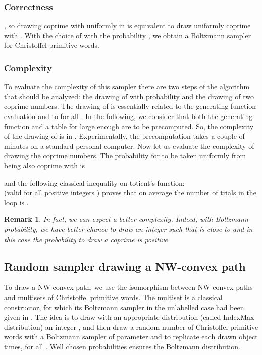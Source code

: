 \documentclass{article}
\newtheorem{remark}[theorem]{Remark}
\begin{document}
 \subsubsection{Correctness}
, so drawing  coprime with  uniformly in  is equivalent to draw uniformly  coprime with .
With the choice of  with the probability , we obtain a Boltzmann sampler for Christoffel primitive words.
\subsubsection{Complexity}
To evaluate the complexity of this sampler there are two steps
of the algorithm that should be analyzed: the drawing of 
with probability  and the drawing of two coprime numbers.
The drawing of  is essentially related to the generating
function evaluation and to  for all . In
the following, we consider that both the generating function and a
table for large enough  are to be precomputed. So,
the complexity of the drawing of  is in . Experimentally,
the precomputation takes a couple of minutes on a standard
personal computer. Now let us evaluate the complexity of drawing
the coprime numbers. The probability for  to be taken
uniformly from  being also coprime with  is

and the following classical inequality \cite[Thm 8.8.7]{BachShallit} on totient's function:\\
  (valid for all positive integers
) proves
that on average the number of trials in the loop is .\\
\begin{remark}
In fact, we can expect a better complexity. Indeed, with Boltzmann probability, we have better chance to draw an integer  such that  is close to  and in this case the probability to draw a coprime  is positive.
\end{remark}






\subsection{Random sampler drawing a NW-convex path}

To draw a NW-convex path, we use the isomorphism between NW-convex paths and multisets of Christoffel primitive words. 
The multiset is a classical constructor, for which its Boltzmann sampler in the unlabelled case had been given in \cite{FlaFuPi07}.
The idea is to draw with an appropriate distribution (called IndexMax distribution) an integer , 
and then draw a random number of Christoffel primitive words with a Boltzmann sampler of parameter  and to 
replicate each drawn object  times, for all . Well chosen probabilities ensures the Boltzmann distribution.
\end{document}
